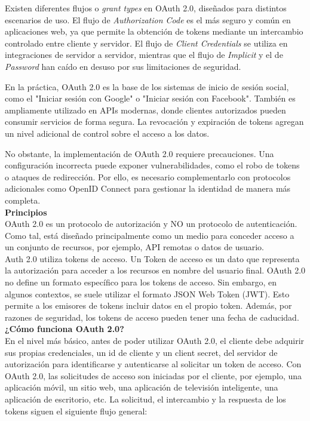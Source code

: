 \documentclass[12pt,letterpaper]{article}
\begin{document}
Existen diferentes flujos o \textit{grant types} en OAuth 2.0, diseñados para distintos escenarios de uso. El flujo de \textit{Authorization Code} es el más seguro y común en aplicaciones web, ya que permite la obtención de tokens mediante un intercambio controlado entre cliente y servidor. El flujo de \textit{Client Credentials} se utiliza en integraciones de servidor a servidor, mientras que el flujo de \textit{Implicit} y el de \textit{Password} han caído en desuso por sus limitaciones de seguridad. 

En la práctica, OAuth 2.0 es la base de los sistemas de inicio de sesión social, como el "Iniciar sesión con Google" o "Iniciar sesión con Facebook". También es ampliamente utilizado en APIs modernas, donde clientes autorizados pueden consumir servicios de forma segura. La revocación y expiración de tokens agregan un nivel adicional de control sobre el acceso a los datos. 

No obstante, la implementación de OAuth 2.0 requiere precauciones. Una configuración incorrecta puede exponer vulnerabilidades, como el robo de tokens o ataques de redirección. Por ello, es necesario complementarlo con protocolos adicionales como OpenID Connect para gestionar la identidad de manera más completa. \\

\textbf{Principios} \\
OAuth 2.0 es un protocolo de autorización y NO un protocolo de autenticación. Como tal, está diseñado principalmente como un medio para conceder acceso a un conjunto de recursos, por ejemplo, API remotas o datos de usuario.\\
Auth 2.0 utiliza tokens de acceso. Un Token de acceso es un dato que representa la autorización para acceder a los recursos en nombre del usuario final. OAuth 2.0 no define un formato específico para los tokens de acceso. Sin embargo, en algunos contextos, se suele utilizar el formato JSON Web Token (JWT). Esto permite a los emisores de tokens incluir datos en el propio token. Además, por razones de seguridad, los tokens de acceso pueden tener una fecha de caducidad.\\

\textbf{¿Cómo funciona OAuth 2.0?} \\
En el nivel más básico, antes de poder utilizar OAuth 2.0, el cliente debe adquirir sus propias credenciales, un id de cliente y un client secret, del servidor de autorización para identificarse y autenticarse al solicitar un token de acceso. Con OAuth 2.0, las solicitudes de acceso son iniciadas por el cliente, por ejemplo, una aplicación móvil, un sitio web, una aplicación de televisión inteligente, una aplicación de escritorio, etc. La solicitud, el intercambio y la respuesta de los tokens siguen el siguiente flujo general: \\
\end{document}
